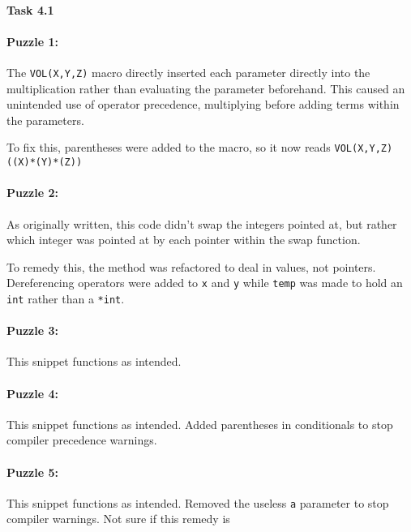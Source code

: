 \documentclass[11pt]{article}
\begin{document}
\paragraph{Task 4.1}
\paragraph{Puzzle 1:}

The \verb|VOL(X,Y,Z)| macro directly inserted each parameter directly into the multiplication rather than evaluating the parameter beforehand. This caused an unintended use of operator precedence, multiplying before adding terms within the parameters.

To fix this, parentheses were added to the macro, so it now reads \verb|VOL(X,Y,Z) ((X)*(Y)*(Z))|

\paragraph{Puzzle 2:}

As originally written, this code didn't swap the integers pointed at, but rather which integer was pointed at by each pointer within the swap function.

To remedy this, the method was refactored to deal in values, not pointers. Dereferencing operators were added to \verb|x| and \verb|y| while \verb|temp| was made to hold an \verb|int| rather than a \verb|*int|.

\paragraph{Puzzle 3:}

This snippet functions as intended.

\paragraph{Puzzle 4:}

This snippet functions as intended. Added parentheses in conditionals to stop compiler precedence warnings.

\paragraph{Puzzle 5:}

This snippet functions as intended. Removed the useless \verb|a| parameter to stop compiler warnings. Not sure if this remedy is
\end{document}
